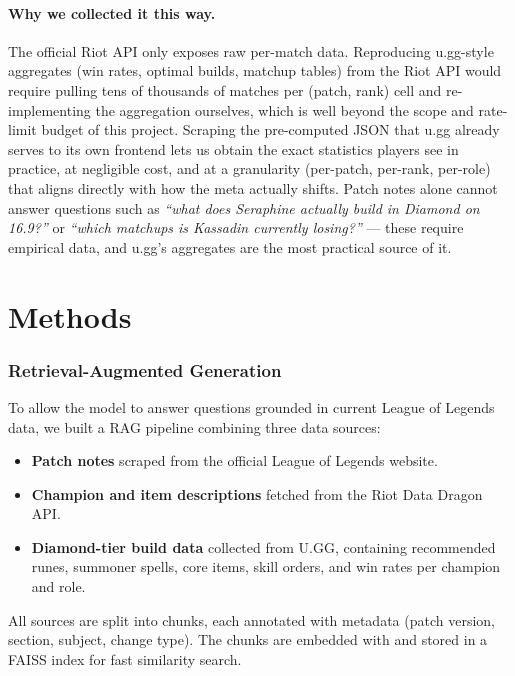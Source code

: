 \documentclass[fleqn,moreauthors,10pt]{ds_report}
\begin{document}
\paragraph{Why we collected it this way.}
The official Riot API only exposes raw per-match data. Reproducing u.gg-style aggregates
(win rates, optimal builds, matchup tables) from the Riot API would require pulling tens
of thousands of matches per (patch, rank) cell and re-implementing the aggregation
ourselves, which is well beyond the scope and rate-limit budget of this project. Scraping
the pre-computed JSON that u.gg already serves to its own frontend lets us obtain the
exact statistics players see in practice, at negligible cost, and at a granularity
(per-patch, per-rank, per-role) that aligns directly with how the meta actually shifts.
Patch notes alone cannot answer questions such as \textit{``what does Seraphine actually
build in Diamond on 16.9?''} or \textit{``which matchups is Kassadin currently losing?''}
— these require empirical data, and u.gg's aggregates are the most practical source of
it.

\section*{Methods}

\subsubsection*{Retrieval-Augmented Generation}

To allow the model to answer questions grounded in current League of Legends data, we built a RAG pipeline combining three data sources:

\begin{itemize} \item \textbf{Patch notes} scraped from the official League of Legends website. \item \textbf{Champion and item descriptions} fetched from the Riot Data Dragon API. \item \textbf{Diamond-tier build data} collected from U.GG, containing recommended runes, summoner spells, core items, skill orders, and win rates per champion and role. \end{itemize}

All sources are split into chunks, each annotated with metadata (patch version, section, subject, change type). The chunks are embedded with  and stored in a FAISS index for fast similarity search.
\end{document}
